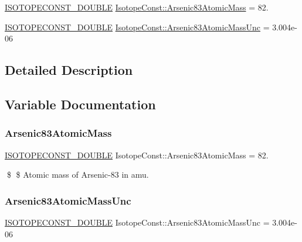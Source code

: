 \begin{DoxyCompactItemize}
\item 
\mbox{\hyperlink{group___isotope_const-_macros_ga8f45a7272ce02c0b4c65c44636ed719a}{I\+S\+O\+T\+O\+P\+E\+C\+O\+N\+S\+T\+\_\+\+D\+O\+U\+B\+LE}} \mbox{\hyperlink{group___isotope_const-_arsenic-_as83_ga3e09b4869bbf2665e5ba809bd9ae4329}{Isotope\+Const\+::\+Arsenic83\+Atomic\+Mass}} = 82.
\item 
\mbox{\hyperlink{group___isotope_const-_macros_ga8f45a7272ce02c0b4c65c44636ed719a}{I\+S\+O\+T\+O\+P\+E\+C\+O\+N\+S\+T\+\_\+\+D\+O\+U\+B\+LE}} \mbox{\hyperlink{group___isotope_const-_arsenic-_as83_gadd350d55375458e8cc5bb275bc562b50}{Isotope\+Const\+::\+Arsenic83\+Atomic\+Mass\+Unc}} = 3.\+004e-\/06
\end{DoxyCompactItemize}


\subsection{Detailed Description}


\subsection{Variable Documentation}
\mbox{\label{group___isotope_const-_arsenic-_as83_ga3e09b4869bbf2665e5ba809bd9ae4329}} 
\subsubsection{\texorpdfstring{Arsenic83\+Atomic\+Mass}{Arsenic83AtomicMass}}
{\footnotesize\ttfamily \mbox{\hyperlink{group___isotope_const-_macros_ga8f45a7272ce02c0b4c65c44636ed719a}{I\+S\+O\+T\+O\+P\+E\+C\+O\+N\+S\+T\+\_\+\+D\+O\+U\+B\+LE}} Isotope\+Const\+::\+Arsenic83\+Atomic\+Mass = 82.}

\$ \$ Atomic mass of Arsenic-\/83 in amu. \mbox{\label{group___isotope_const-_arsenic-_as83_gadd350d55375458e8cc5bb275bc562b50}} 
\subsubsection{\texorpdfstring{Arsenic83\+Atomic\+Mass\+Unc}{Arsenic83AtomicMassUnc}}
{\footnotesize\ttfamily \mbox{\hyperlink{group___isotope_const-_macros_ga8f45a7272ce02c0b4c65c44636ed719a}{I\+S\+O\+T\+O\+P\+E\+C\+O\+N\+S\+T\+\_\+\+D\+O\+U\+B\+LE}} Isotope\+Const\+::\+Arsenic83\+Atomic\+Mass\+Unc = 3.\+004e-\/06}

